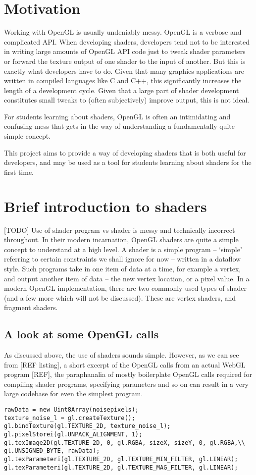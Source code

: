 \documentclass[12pt,twoside,notitlepage]{report}
\begin{document}
\section{Motivation}
Working with OpenGL is usually undeniably messy. OpenGL is a verbose and complicated API. When developing shaders, developers tend not to be interested in writing large amounts of OpenGL API code just to tweak shader parameters or forward the texture output of one shader to the input of another. But this is exactly what developers have to do. Given that many graphics applications are written in compiled languages like C and C++, this significantly increases the length of a development cycle. Given that a large part of shader development constitutes small tweaks to (often subjectively) improve output, this is not ideal.

For students learning about shaders, OpenGL is often an intimidating and confusing mess that gets in the way of understanding a fundamentally quite simple concept.

This project aims to provide a way of developing shaders that is both useful for developers, and may be used as a tool for students learning about shaders for the first time.
\section{Brief introduction to shaders}
[TODO] Use of shader program vs shader is messy and technically incorrect throughout.
In their modern incarnation, OpenGL shaders are quite a simple concept to understand at a high level. A shader is a simple program -- `simple' referring to certain constraints we shall ignore for now -- written in a dataflow style. Such programs take in one item of data at a time, for example a vertex, and output another item of data -- the new vertex location, or a pixel value.
In a modern OpenGL implementation, there are two commonly used types of shader (and a few more which will not be discussed). These are vertex shaders, and fragment shaders. 
\subsection{A look at some OpenGL calls}
As discussed above, the use of shaders sounds simple. However, as we can see from [REF listing], a short excerpt of the OpenGL calls from an actual WebGL program [REF], the paraphanalia of mostly boilerplate OpenGL calls required for compiling shader programs, specifying parameters and so on can result in a very large codebase for even the simplest program.
\begin{verbatim}
rawData = new Uint8Array(noisepixels);
texture_noise_l = gl.createTexture();
gl.bindTexture(gl.TEXTURE_2D, texture_noise_l);
gl.pixelStorei(gl.UNPACK_ALIGNMENT, 1);
gl.texImage2D(gl.TEXTURE_2D, 0, gl.RGBA, sizeX, sizeY, 0, gl.RGBA,\\ gl.UNSIGNED_BYTE, rawData);
gl.texParameteri(gl.TEXTURE_2D, gl.TEXTURE_MIN_FILTER, gl.LINEAR);
gl.texParameteri(gl.TEXTURE_2D, gl.TEXTURE_MAG_FILTER, gl.LINEAR);
\end{verbatim}
\end{document}
